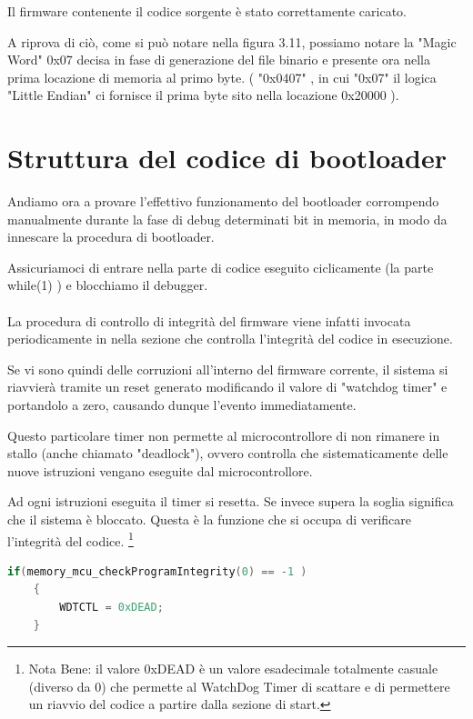 \documentclass[LaM,binding=0.6cm]{../sapthesis}
\begin{document}
Il firmware contenente il codice sorgente è stato correttamente caricato. 

A riprova di ciò, come si può notare nella figura 3.11, possiamo notare la "Magic Word" 0x07 decisa in fase di generazione del file binario e presente ora nella prima locazione di memoria al primo byte. ( "0x0407" , in cui "0x07" il logica "Little Endian" ci fornisce il prima byte sito nella locazione 0x20000 ).





\clearpage


\section{Struttura del codice di bootloader}

Andiamo ora a provare l'effettivo funzionamento del bootloader corrompendo manualmente durante la fase di debug determinati bit in memoria, in modo da innescare la procedura di bootloader.

Assicuriamoci di entrare nella parte di codice eseguito ciclicamente (la parte while(1) ) e blocchiamo il debugger.
\\\\
La procedura di controllo di integrità del firmware viene infatti invocata periodicamente in nella sezione che controlla l'integrità del codice in esecuzione.

Se vi sono quindi delle corruzioni all'interno del firmware corrente, il sistema si riavvierà tramite un reset generato modificando il valore di "watchdog timer" e portandolo a zero, causando dunque l'evento immediatamente.

Questo particolare timer non permette al microcontrollore di non rimanere in stallo (anche chiamato "deadlock"), ovvero controlla che sistematicamente delle nuove istruzioni vengano eseguite dal microcontrollore.

Ad ogni istruzioni eseguita il timer si resetta. Se invece supera la soglia significa che il sistema è bloccato.
\newline
Questa è la funzione che si occupa di verificare l’integrità del codice.
\footnote{Nota Bene: il valore 0xDEAD è un valore esadecimale totalmente casuale (diverso da 0) che permette al WatchDog Timer di scattare e di permettere un riavvio del codice a partire dalla sezione di start.}
\begin{lstlisting}[language=C]
    if(memory_mcu_checkProgramIntegrity(0) == -1 )
    {
        WDTCTL = 0xDEAD;
    }
\end{lstlisting}
\end{document}

